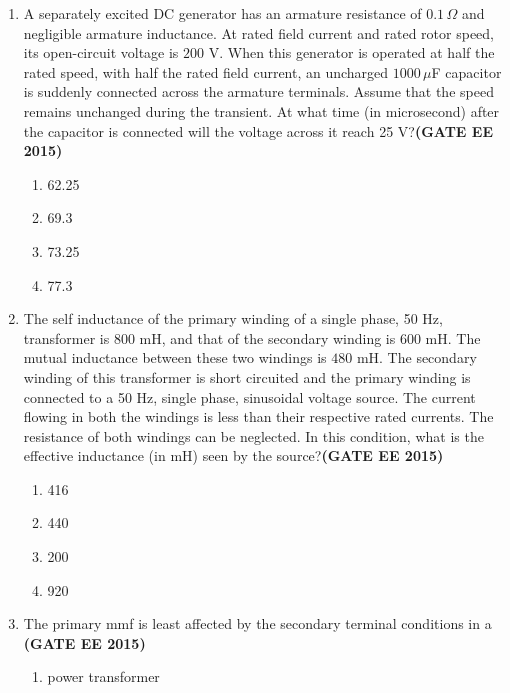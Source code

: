\documentclass[a4paper,12pt]{exam}
\theoremstyle{remark}
\begin{document}
\begin{enumerate}
\item A separately excited DC generator has an armature resistance of $0.1\,\Omega$ and negligible armature inductance. At rated field current and rated rotor speed, its open-circuit voltage is $200$ V. When this generator is operated at half the rated speed, with half the rated field current, an uncharged $1000\,\mu$F capacitor is suddenly connected across the armature terminals. Assume that the speed remains unchanged during the transient. At what time (in microsecond) after the capacitor is connected will the voltage across it reach 25 V?\hfill{\textbf{(GATE EE 2015)}}
\begin{multicols}{4}
    \begin{enumerate}
        \item 62.25
        \item 69.3
        \item 73.25
        \item 77.3
    \end{enumerate}
\end{multicols}
\item The self inductance of the primary winding of a single phase, 50 Hz, transformer is $800$ mH, and that of the secondary winding is $600$ mH. The mutual inductance between these two windings is $480$ mH. The secondary winding of this transformer is short circuited and the primary winding is connected to a 50 Hz, single phase, sinusoidal voltage source. The current flowing in both the windings is less than their respective rated currents. The resistance of both windings can be neglected. In this condition, what is the effective inductance (in mH) seen by the source?\hfill{\textbf{(GATE EE 2015)}}
\begin{multicols}{4}
    \begin{enumerate}
        \item 416
        \item 440
        \item 200
        \item 920
    \end{enumerate}
\end{multicols}
\item The primary mmf is least affected by the secondary terminal conditions in a\\ \hfill{\textbf{(GATE EE 2015)}}
\begin{multicols}{2}
    \begin{enumerate}
        \item power transformer

\end{enumerate}
\end{multicols}
\end{enumerate}
\end{document}
